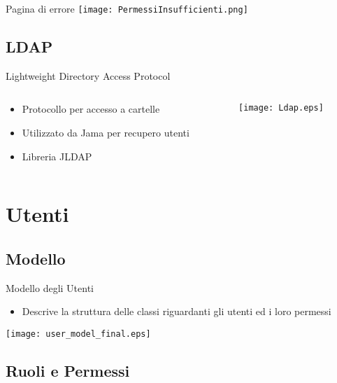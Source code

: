 \begin{frame}{Pagina di errore}
\centering
	\texttt{[image: PermessiInsufficienti.png]}
\end{frame}

\subsection{LDAP}
\begin{frame}{Lightweight Directory Access Protocol}
\begin{columns}[T]
\begin{column}{.5\textwidth}
\begin{itemize}
\item Protocollo per accesso a cartelle
\item Utilizzato da Jama per recupero utenti
\item Libreria JLDAP
\end{itemize}
\end{column}

\begin{column}{.5\textwidth}
\vspace{0.7em}
\texttt{[image: Ldap.eps]}
\end{column}




\end{columns}

\end{frame}


\section{Utenti}
\subsection{Modello}
\begin{frame}{Modello degli Utenti}
\begin{itemize}
\item Descrive la struttura delle classi riguardanti gli utenti\newline
ed i loro permessi
\end{itemize}	

\vspace{0.8em}
\centering
\texttt{[image: user\_model\_final.eps]}

\end{frame}

\subsection{Ruoli e Permessi}

